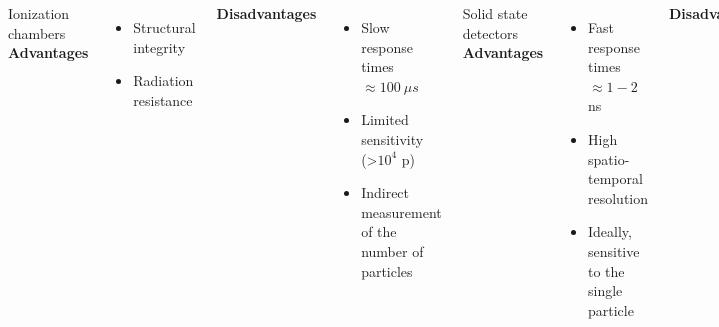 \documentclass[aspectratio=169]{beamer}
\begin{document}
\begin{frame}
\begin{columns}
\begin{center}
			\end{center}
			{\color{blue} Ionization chambers}
			\newline
			\textbf{Advantages}
			\begin{itemize}
				\item Structural integrity
				\item Radiation resistance
			\end{itemize}
			\textbf{Disadvantages}
			\begin{itemize}
				\item Slow response times $\approx 100\:\mu s$
				\item Limited sensitivity (>$10^4$ p)
				\item Indirect measurement of the number of particles
			\end{itemize}
			{\color{blue} Solid state detectors}
			\newline
			\textbf{Advantages}
			\begin{itemize}
				\item Fast response times $\approx 1-2$ ns
				\item High spatio-temporal resolution
				\item Ideally, sensitive to the single particle
			\end{itemize}
			\textbf{Disadvantages}
			\begin{itemize}
				\item Complex and fast readout electronics
				\item Damage from radiation
				\item pile-up effects at high\newline rates
			\end{itemize}
		\end{columns}
	\end{frame}
\end{document}
